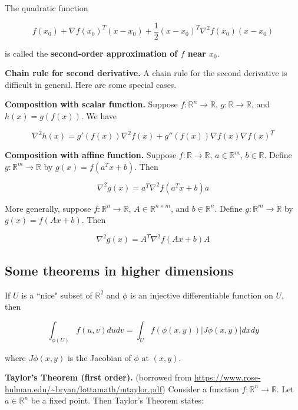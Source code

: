 The quadratic function

\[
f(x_0) + \nabla f(x_0)^T (x - x_0) + \frac{1}{2} (x - x_0)^T \nabla^2 f(x_0) (x - x_0)
\]

is called the \textbf{second-order approximation of \(f\) near \(x_0\)}.

\textbf{Chain rule for second derivative.} A chain rule for the second derivative is difficult in general. Here are some special cases.

\textbf{Composition with scalar function.} Suppose \(f: \mathbb{R}^n \to \mathbb{R}\), \(g: \mathbb{R} \to \mathbb{R}\), and \(h(x) = g(f(x))\). We have

\[
\nabla^2 h(x) = g'(f(x)) \nabla^2 f(x) + g''(f(x)) \nabla f(x) \nabla f(x)^T
\]

\textbf{Composition with affine function.} Suppose  \(f: \mathbb{R} \to \mathbb{R}\), \(a \in \mathbb{R}^m\), \(b \in \mathbb{R}\). Define \(g: \mathbb{R}^m \to \mathbb{R}\) by \(g(x) = f(a^Tx + b)\). Then

\[
\nabla^2 g(x) = a^T \nabla^2 f(a^Tx + b) a
\]


More generally, suppose  \(f: \mathbb{R}^n \to \mathbb{R}\), \(A \in \mathbb{R}^{n \times m}\), and \(b \in \mathbb{R}^n\). Define \(g: \mathbb{R}^m \to \mathbb{R}\) by \(g(x) = f(Ax + b)\). Then

\[
\nabla^2 g(x) = A^T \nabla^2 f(Ax + b) A
\]

\subsection{Some theorems in higher dimensions}

\begin{proposition}If \(U\) is a ``nice" subset of \(\mathbb{R}^2\) and \(\phi\) is an injective differentiable function on \(U\), then 

\[
 \int_{\phi(U)} f(u,v) dudv = \int_U f(\phi(x,y)) | J \phi(x,y) | dx dy
\]

where \( J \phi(x,y)\) is the Jacobian of \(\phi\) at \((x,y)\).

\end{proposition}

\textbf{Taylor's Theorem (first order).} (borrowed from \url{https://www.rose-hulman.edu/~bryan/lottamath/mtaylor.pdf}) Consider a function \(f: \mathbb{R}^n \to \mathbb{R}\). Let \(a \in \mathbb{R}^n\) be a fixed point. Then Taylor's Theorem states:

